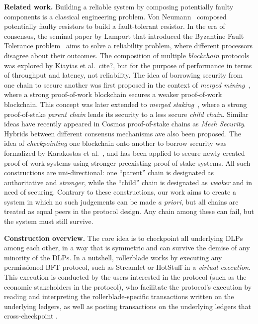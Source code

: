 \noindent
\textbf{Related work.} Building a reliable system by composing potentially faulty components
is a classical engineering problem. Von Neumann~\cite{?} composed potentially faulty
resistors to build a fault-tolerant resistor. In the era of consensus, the seminal
paper by Lamport that introduced the Byzantine Fault Tolerance problem~\cite{lamport}
aims to solve a reliability problem, where different processors disagree about their
outcomes. The composition of multiple \emph{blockchain} protocols was explored by
Kiayias et al.~cite{?}, but for the purpose of performance in terms of throughput
and latency, not reliability. The idea of borrowing security from one chain to
secure another was first proposed in the context of \emph{merged mining}~\cite{namecoin}, where
a strong proof-of-work blockchain secures a weaker proof-of-work blockchain. This
concept was later extended to \emph{merged staking}~\cite{pos-sidechains}, where a
strong proof-of-stake \emph{parent chain} lends its security to a less secure
\emph{child chain}. Similar ideas have recently appeared in Cosmos proof-of-stake
chains as \emph{Mesh Security}. Hybrids between different consensus mechanisms
ave also been proposed. The idea of \emph{checkpointing}
one blockchain onto another to borrow security was formalized by Karakostas et al.~\cite{?},
and has been applied to secure newly created proof-of-work systems using stronger
preexisting proof-of-stake systems. All such constructions are uni-directional:
one ``parent'' chain is designated as authoritative and \emph{stronger},
while the ``child'' chain is designated as \emph{weaker} and in need of securing.
Contrary to these constructions, our work aims to create a system in which
no such judgements can be made \emph{a priori}, but all chains are treated
as equal peers in the protocol design. Any chain among these can fail, but
the system must still survive.

\noindent
\textbf{Construction overview.}
The core idea is to checkpoint all underlying DLPs among each other, in
a way that is symmetric and can survive the demise of any minority of the
DLPs.
In a nutshell, rollerblade works by executing any permissioned BFT protocol,
such as Streamlet or HotStuff in a \emph{virtual execution}. This execution is
conducted by the users interested in the protocol (such as the economic stakeholders
in the protocol), who facilitate the protocol's execution by reading and interpreting
the rollerblade-specific transactions written on the underlying ledgers, as well as
posting transactions on the underlying ledgers that cross-checkpoint .

